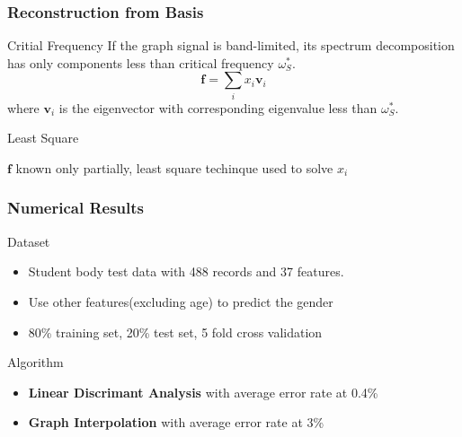 \documentclass{beamer}
\DeclarePairedDelimiter{\norm}{\lVert}{\rVert}
\begin{document}
\begin{frame}
\frametitle{Reconstruction from Basis}
\begin{block}{Critial Frequency}
If the graph signal is band-limited, its spectrum decomposition has only components less than critical frequency $\omega^*_S$.
\begin{equation}
 \bm{f} = \sum_{i}x_i\bm{v}_i
\end{equation}
where $\bm{v}_i$ is the eigenvector with corresponding eigenvalue less than $\omega^*_S$.
\end{block}
\begin{block}{Least Square}
\end{block}
$\bm{f}$ known only partially, least square techinque used to solve $x_i$

\end{frame}
\begin{frame}
\frametitle{Numerical Results}
\begin{block}{Dataset}
\begin{itemize}
\item Student body test data with 488 records and 37 features.
\item Use other features(excluding age) to predict the gender
\item 80\% training set, 20\% test set, 5 fold cross validation
\end{itemize}
\end{block}
\begin{block}{Algorithm}
\begin{itemize}
\item \textbf{Linear Discrimant Analysis} with average error rate at 0.4\%
\item \textbf{Graph Interpolation} with average error rate at 3\%
\end{itemize}
\end{block}
\end{frame}
\end{document}
